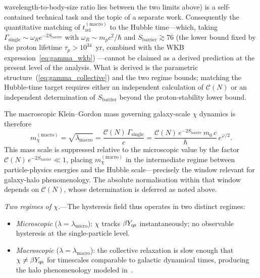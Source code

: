 \documentclass[aps,prd,onecolumn,superscriptaddress,nofootinbib,showpacs,12pt,notitlepage]{revtex4-2}
\begin{document}
wavelength-to-body-size ratio lies between the two
limits above) is a self-contained technical task and
the topic of a separate work.  Consequently the
quantitative matching of
$t_{\mathrm{rel}}^{(\mathrm{macro})}$ to the Hubble
time---which, taking $\Gamma_{\mathrm{single}}
\sim \omega_R e^{-2S_{\mathrm{barrier}}}$ with
$\omega_R \sim m_p c^2/\hbar$ and
$S_{\mathrm{barrier}} \gtrsim 76$ (the lower bound fixed
by the proton lifetime $\tau_p > 10^{34}$~yr, combined
with the WKB expression~\ref{eq:gamma_wkb})
---cannot be claimed as a derived prediction at the
present level of the analysis.  What is derived is the
parametric structure~(\ref{eq:gamma_collective}) and the
two regime bounds; matching the Hubble-time target
requires either an independent calculation of
$\mathcal{C}(N)$ or an independent determination of
$S_{\mathrm{barrier}}$ beyond the proton-stability
lower bound.

The macroscopic Klein--Gordon mass governing
galaxy-scale $\chi$ dynamics is therefore
\begin{equation}\label{eq:lambda_macro}
  \boxed{
  m_{\chi}^{(\mathrm{macro})}
  = \sqrt{\lambda_{\mathrm{macro}}}
  = \frac{\mathcal{C}(N)\,\Gamma_{\mathrm{single}}}{c}
  = \frac{\mathcal{C}(N)\,e^{-2S_{\mathrm{barrier}}}\,m_{0}\,c}
         {\hbar}\,e^{\varphi/2}.
  }
\end{equation}
This mass scale is suppressed relative to the
microscopic value by the factor
$\mathcal{C}(N)\,e^{-2S_{\mathrm{barrier}}} \ll 1$,
placing $m_{\chi}^{(\mathrm{macro})}$ in the intermediate
regime between particle-physics energies and the Hubble
scale---precisely the window relevant for galaxy-halo
phenomenology.  The absolute normalisation within that
window depends on $\mathcal{C}(N)$, whose determination
is deferred as noted above.

\textit{Two regimes of $\chi$.}---The hysteresis
field thus operates in two distinct regimes:
\begin{itemize}
  \item \textit{Microscopic}
    ($\lambda = \lambda_{\mathrm{micro}}$): $\chi$ tracks
    $\beta Y_{\rm qs}$ instantaneously; no observable hysteresis
    at the single-particle level.
  \item \textit{Macroscopic}
    ($\lambda = \lambda_{\mathrm{macro}}$): the
    collective relaxation is slow enough that
    $\chi \neq \beta Y_{\rm qs}$ for timescales comparable to
    galactic dynamical times, producing the halo
    phenomenology modeled in~\cite{Lotishvili2026}.
\end{itemize}
\end{document}
